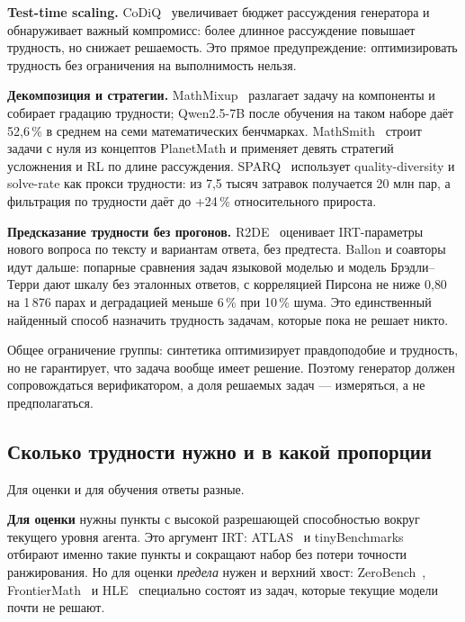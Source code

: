 \documentclass[11pt,a4paper]{article}
\begin{document}
\textbf{Test-time scaling.} CoDiQ~\cite{codiq2026} увеличивает бюджет
рассуждения генератора и обнаруживает важный компромисс: более длинное
рассуждение повышает трудность, но снижает решаемость. Это прямое
предупреждение: оптимизировать трудность без ограничения на выполнимость
нельзя.

\textbf{Декомпозиция и стратегии.} MathMixup~\cite{mathmixup2026} разлагает
задачу на компоненты и собирает градацию трудности; Qwen2.5-7B после
обучения на таком наборе даёт 52{,}6\,\% в среднем на семи математических
бенчмарках. MathSmith~\cite{mathsmith2025} строит задачи с нуля из
концептов PlanetMath и применяет девять стратегий усложнения и RL по длине
рассуждения. SPARQ~\cite{sparq2025} использует quality-diversity и
solve-rate как прокси трудности: из 7,5 тысяч затравок получается 20 млн пар,
а фильтрация по трудности даёт до +24\,\% относительного прироста.

\textbf{Предсказание трудности без прогонов.} R2DE~\cite{r2de2020} оценивает
IRT-параметры нового вопроса по тексту и вариантам ответа, без предтеста.
Ballon и соавторы~\cite{llmcompare2025} идут дальше: попарные сравнения
задач языковой моделью и модель Брэдли--Терри дают шкалу без эталонных
ответов, с корреляцией Пирсона не ниже 0{,}80 на 1\,876 парах и деградацией
меньше 6\,\% при 10\,\% шума. Это единственный найденный способ назначить
трудность задачам, которые пока не решает никто.

Общее ограничение группы: синтетика оптимизирует правдоподобие и трудность,
но не гарантирует, что задача вообще имеет решение. Поэтому генератор
должен сопровождаться верификатором, а доля решаемых задач — измеряться, а
не предполагаться.

\subsection{Сколько трудности нужно и в какой пропорции}

Для оценки и для обучения ответы разные.

\textbf{Для оценки} нужны пункты с высокой разрешающей способностью вокруг
текущего уровня агента. Это аргумент IRT: ATLAS~\cite{atlas2025} и
tinyBenchmarks~\cite{tinybenchmarks2024} отбирают именно такие пункты и
сокращают набор без потери точности ранжирования. Но для оценки
\emph{предела} нужен и верхний хвост: ZeroBench~\cite{zerobench2025},
FrontierMath~\cite{frontiermath2024} и HLE~\cite{hle2025} специально состоят
из задач, которые текущие модели почти не решают.
\end{document}
